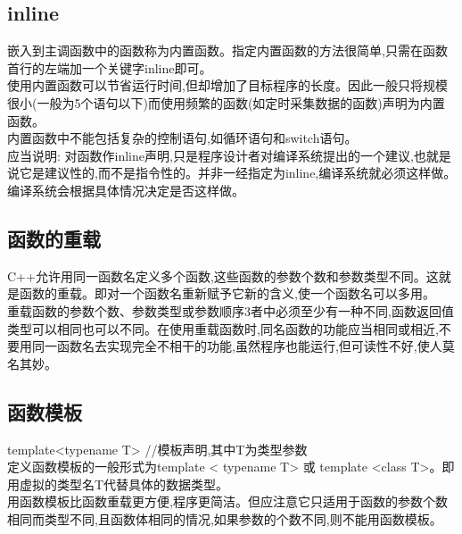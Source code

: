 \documentclass[11pt,a4paper,titlepage]{article}
\begin{document}
{\subsection{inline}
嵌入到主调函数中的函数称为内置函数。指定内置函数的方法很简单,只需在函数首行的左端加一个关键字inline即可。\\
使用内置函数可以节省运行时间,但却增加了目标程序的长度。因此一般只将规模很小(一般为5个语句以下)而使用频繁的函数(如定时采集数据的函数)声明为内置函数。\\
内置函数中不能包括复杂的控制语句,如循环语句和switch语句。\\
应当说明: 对函数作inline声明,只是程序设计者对编译系统提出的一个建议,也就是说它是建议性的,而不是指令性的。并非一经指定为inline,编译系统就必须这样做。编译系统会根据具体情况决定是否这样做。\\

\subsection{函数的重载}
C++允许用同一函数名定义多个函数,这些函数的参数个数和参数类型不同。这就是函数的重载。即对一个函数名重新赋予它新的含义,使一个函数名可以多用。\\
重载函数的参数个数、参数类型或参数顺序3者中必须至少有一种不同,函数返回值类型可以相同也可以不同。在使用重载函数时,同名函数的功能应当相同或相近,不要用同一函数名去实现完全不相干的功能,虽然程序也能运行,但可读性不好,使人莫名其妙。\\

\subsection{函数模板}
template<typename T>   //模板声明,其中T为类型参数\\
定义函数模板的一般形式为template < typename T> 或 template <class T>。即用虚拟的类型名T代替具体的数据类型。\\
用函数模板比函数重载更方便,程序更简洁。但应注意它只适用于函数的参数个数相同而类型不同,且函数体相同的情况,如果参数的个数不同,则不能用函数模板。\\

}
\end{document}
